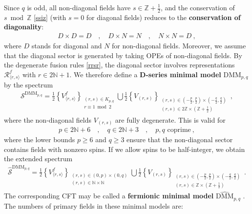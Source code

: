 \documentclass[12pt, a4paper]{article}
\newcommand{\myindex}[1]{\textbf{\boldmath #1}}
\theoremstyle{break}
\begin{document}
Since $q$ is odd, all non-diagonal fields have $s\in \mathbb{Z}+\frac12$, and the conservation of $s\bmod \mathbb{Z}$ \eqref{ssiz} (with $s=0$ for diagonal fields) reduces to the \myindex{conservation of diagonality}:
\begin{align}
D\times D = D \quad , \quad D\times N = N \quad , \quad N\times N = D \ ,
\label{ddd}
\end{align}
where $D$ stands for diagonal and $N$ for non-diagonal fields. 
Moreover, we assume that the diagonal sector is generated by taking OPEs of non-diagonal fields. 
By the degenerate fusion rules \eqref{rrsr}, the diagonal sector involves representations $\mathcal{R}^f_{\langle r,s\rangle}$ with $r\in 2\mathbb{N}+1$. We therefore define a \myindex{D-series minimal model} $\text{DMM}_{p,q}$ by the spectrum
\begin{align}
 \boxed{\mathcal{S}^{\text{DMM}_{p,q}} = \frac12\left\{ V^f_{\langle r,s\rangle} \right\}_{\substack{(r,s)\in K_{p, q}\\ r\equiv 1\bmod 2}} 
 \bigcup 
 \frac12\left\{V_{(r,s)} \right\}_{\substack{(r,s)\in (-\frac{p}{2},\frac{p}{2})\times (-\frac{q}{2},\frac{q}{2})\\ (r,s)\in 2\mathbb{Z}\times (\mathbb{Z}+\frac12)}}
}\ ,
\label{sdmm}
\end{align}
where the non-diagonal fields $V_{(r,s)}$ are fully degenerate. This is valid for 
\begin{align}
 \boxed{p\in 2\mathbb{N}+6 \quad , \quad q \in 2\mathbb{N}+3 \quad ,\quad p,q\text{ coprime}} \ ,
\end{align}
where the lower bounds $p\geq 6$ and $q\geq 3$ ensure that the non-diagonal sector contains fields with nonzero spins. If we allow spins to be half-integer, we obtain the extended spectrum
\begin{align}
 \widehat{\mathcal{S}}^{\text{DMM}_{p,q}} = \frac12\left\{ V^f_{\langle r,s\rangle} \right\}_{\substack{(r,s)\in (0,p) \times (0,q)\\ (r,s)\in \mathbb{N}\times \mathbb{N}}} 
 \bigcup 
 \frac12\left\{V_{(r,s)} \right\}_{\substack{(r,s)\in (-\frac{p}{2},\frac{p}{2})\times (-\frac{q}{2},\frac{q}{2})\\ (r,s)\in \mathbb{Z}\times (\mathbb{Z}+\frac12)}}
\ .
\end{align}
The corresponding CFT may be called a \myindex{fermionic minimal model} $\widehat{\text{DMM}}_{p,q}$ \cite{rw20}. The numbers of primary fields in these minimal models are:
\end{document}
